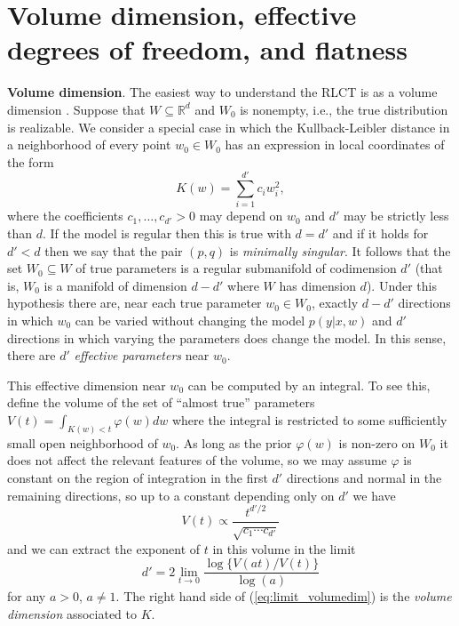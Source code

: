 \documentclass{article} %
\def\be{\begin{equation}}
\def\ee{\end{equation}}
\begin{document}
\section{Volume dimension, effective degrees of freedom, and flatness}
\label{section:no_flat_minima}

\textbf{Volume dimension}. The easiest way to understand the RLCT is as a volume dimension \citep[Theorem 7.1]{watanabe_algebraic_2009}.  Suppose that $W \subseteq \mathbb{R}^d$ and $W_0$ is nonempty, i.e., the true distribution is realizable. We consider a special case in which the Kullback-Leibler distance in a neighborhood of every point $w_0 \in W_0$ has an expression in local coordinates of the form
\begin{equation}\label{eq:local_Kw}
K(w) = \sum_{i=1}^{d'} c_i w_i^2,
\end{equation} %
where the coefficients $c_1,\ldots,c_{d'} > 0$ may depend on $w_0$ and $d'$ may be strictly less than $d$. If the model is regular then this is true with $d = d'$ and if it holds for $d' < d$ then we say that the pair $(p,q)$ is \emph{minimally singular}. It follows that the set $W_0 \subseteq W$ of true parameters is a regular submanifold of codimension $d'$ (that is, $W_0$ is a manifold of dimension $d - d'$ where $W$ has dimension $d$). Under this hypothesis there are, near each true parameter $w_0 \in W_0$, exactly $d - d'$ directions in which $w_0$ can be varied without changing the model $p(y|x,w)$ and $d'$ directions in which varying the parameters does change the model. In this sense, there are $d'$ \emph{effective parameters} near $w_0$. 

This effective dimension near $w_0$ can be computed by an integral. To see this, define the volume of the set of ``almost true'' parameters
$
V(t) = \int_{K(w) < t} \varphi(w) dw
$
where the integral is restricted to some sufficiently small open neighborhood of $w_0$. As long as the prior $\varphi(w)$ is non-zero on $W_0$ it does not affect the relevant features of the volume, so we may assume $\varphi$ is constant on the region of integration in the first $d'$ directions and normal in the remaining directions, so up to a constant depending only on $d'$ we have
\begin{equation}\label{eq:volume_singular}
V(t) \propto  \frac{t^{d'/2}}{\sqrt{c_1 \cdots c_{d'}}}
\end{equation}
and we can extract the exponent of $t$ in this volume in the limit
\be\label{eq:limit_volumedim}
d' = 2 \lim_{t \to 0} \frac{\log\big\{V(at)/V(t)\big\}}{\log(a)}
\ee
for any $a > 0$, $a \neq 1$. The right hand side of (\ref{eq:limit_volumedim}) is the \emph{volume dimension} associated to $K$. 
\end{document}
